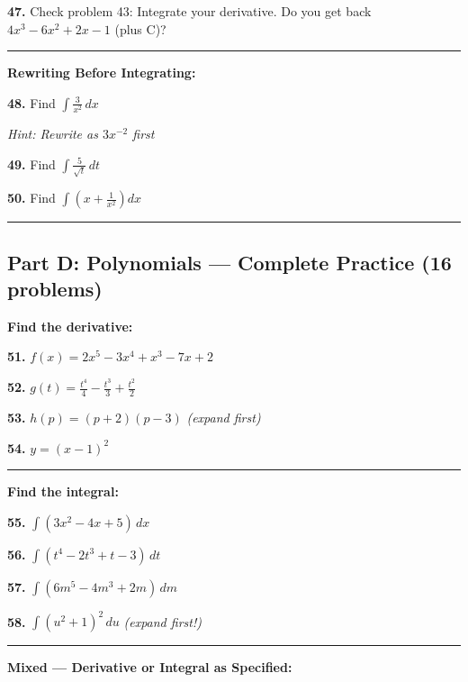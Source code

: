 \documentclass[
  11pt,
]{article}
\begin{document}
\textbf{47.} Check problem 43: Integrate your derivative. Do you get
back \(4x^3 - 6x^2 + 2x - 1\) (plus C)?

\begin{center}\rule{0.5\linewidth}{0.5pt}\end{center}

\textbf{Rewriting Before Integrating:}

\textbf{48.} Find \(\int \frac{3}{x^2} \, dx\)

\emph{Hint: Rewrite as \(3x^{-2}\) first}

\textbf{49.} Find \(\int \frac{5}{\sqrt{t}} \, dt\)

\textbf{50.} Find \(\int \left(x + \frac{1}{x^2}\right) dx\)

\begin{center}\rule{0.5\linewidth}{0.5pt}\end{center}

\hypertarget{part-d-polynomials-complete-practice-16-problems}{%
\subsection{Part D: Polynomials --- Complete Practice (16
problems)}\label{part-d-polynomials-complete-practice-16-problems}}

\textbf{Find the derivative:}

\textbf{51.} \(f(x) = 2x^5 - 3x^4 + x^3 - 7x + 2\)

\textbf{52.} \(g(t) = \frac{t^4}{4} - \frac{t^3}{3} + \frac{t^2}{2}\)

\textbf{53.} \(h(p) = (p + 2)(p - 3)\) \emph{(expand first)}

\textbf{54.} \(y = (x - 1)^2\)

\begin{center}\rule{0.5\linewidth}{0.5pt}\end{center}

\textbf{Find the integral:}

\textbf{55.} \(\int (3x^2 - 4x + 5) \, dx\)

\textbf{56.} \(\int (t^4 - 2t^3 + t - 3) \, dt\)

\textbf{57.} \(\int (6m^5 - 4m^3 + 2m) \, dm\)

\textbf{58.} \(\int (u^2 + 1)^2 \, du\) \emph{(expand first!)}

\begin{center}\rule{0.5\linewidth}{0.5pt}\end{center}

\textbf{Mixed --- Derivative or Integral as Specified:}
\end{document}
